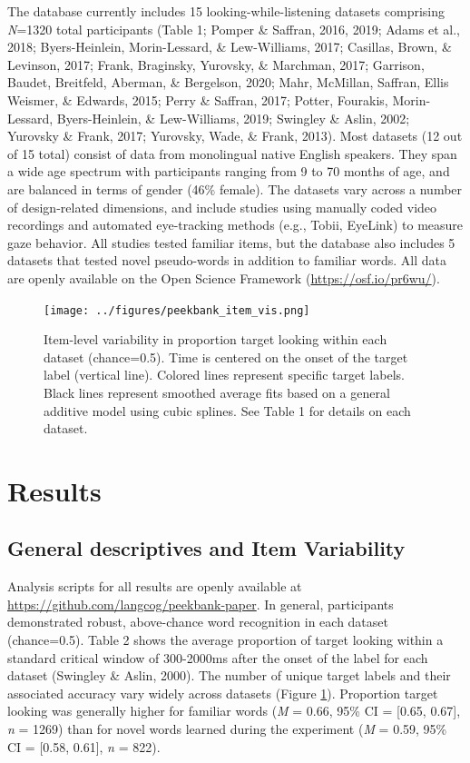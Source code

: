 \documentclass[10pt, letterpaper]{article}
\begin{document}
The database currently includes 15 looking-while-listening datasets
comprising \emph{N}=1320 total participants (Table 1; Pomper \& Saffran,
2016, 2019; Adams et al., 2018; Byers-Heinlein, Morin-Lessard, \&
Lew-Williams, 2017; Casillas, Brown, \& Levinson, 2017; Frank,
Braginsky, Yurovsky, \& Marchman, 2017; Garrison, Baudet, Breitfeld,
Aberman, \& Bergelson, 2020; Mahr, McMillan, Saffran, Ellis Weismer, \&
Edwards, 2015; Perry \& Saffran, 2017; Potter, Fourakis, Morin-Lessard,
Byers-Heinlein, \& Lew-Williams, 2019; Swingley \& Aslin, 2002; Yurovsky
\& Frank, 2017; Yurovsky, Wade, \& Frank, 2013). Most datasets (12 out
of 15 total) consist of data from monolingual native English speakers.
They span a wide age spectrum with participants ranging from 9 to 70
months of age, and are balanced in terms of gender (46\% female). The
datasets vary across a number of design-related dimensions, and include
studies using manually coded video recordings and automated eye-tracking
methods (e.g., Tobii, EyeLink) to measure gaze behavior. All studies
tested familiar items, but the database also includes 5 datasets that
tested novel pseudo-words in addition to familiar words. All data are
openly available on the Open Science Framework
(\url{https://osf.io/pr6wu/}).

\begin{figure} 
\texttt{[image: ../figures/peekbank\_item\_vis.png]}
\caption{Item-level variability in proportion target looking within each dataset (chance=0.5). Time is centered on the onset of the target label (vertical line). Colored lines represent specific target labels. Black lines represent smoothed average fits based on a general additive model using cubic splines. See Table 1 for details on each dataset.}
\label{fig:peekbank_item_vis}
\end{figure}

\hypertarget{results}{%
\section{Results}\label{results}}

\hypertarget{general-descriptives-and-item-variability}{%
\subsection{General descriptives and Item
Variability}\label{general-descriptives-and-item-variability}}

Analysis scripts for all results are openly available at
\url{https://github.com/langcog/peekbank-paper}. In general,
participants demonstrated robust, above-chance word recognition in each
dataset (chance=0.5). Table 2 shows the average proportion of target
looking within a standard critical window of 300-2000ms after the onset
of the label for each dataset (Swingley \& Aslin, 2000). The number of
unique target labels and their associated accuracy vary widely across
datasets (Figure \ref{fig:peekbank_item_vis}). Proportion target looking
was generally higher for familiar words (\emph{M} = 0.66, 95\% CI =
{[}0.65, 0.67{]}, \emph{n} = 1269) than for novel words learned during
the experiment (\emph{M} = 0.59, 95\% CI = {[}0.58, 0.61{]}, \emph{n} =
822).
\end{document}
